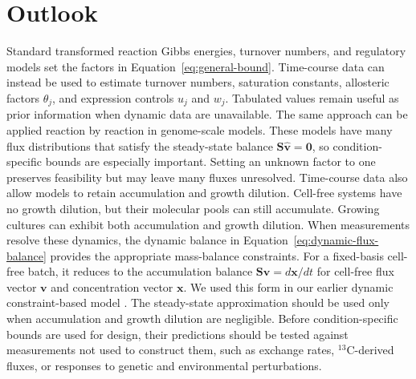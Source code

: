 \section{Outlook}\label{sec:outlook}

Standard transformed reaction Gibbs energies, turnover numbers, and regulatory
models set the factors in Equation~\eqref{eq:general-bound}.
Time-course data can instead be used to estimate turnover numbers, saturation
constants, allosteric factors $\theta_j$, and expression controls $u_j$ and
$w_j$. Tabulated values remain useful as prior information when dynamic data
are unavailable. The same approach can be applied reaction by reaction in
genome-scale models. These models have many flux distributions that satisfy
the steady-state balance $\mathbf S\hat{\mathbf v}=\mathbf 0$, so
condition-specific bounds are
especially important. Setting an unknown factor to one preserves feasibility
but may leave many fluxes unresolved. Time-course data also allow models to
retain accumulation and growth dilution. Cell-free systems have no growth
dilution, but their molecular pools can still accumulate. Growing cultures can
exhibit both accumulation and growth dilution. When measurements resolve these dynamics,
the dynamic balance in Equation~\eqref{eq:dynamic-flux-balance} provides the
appropriate mass-balance constraints. For a fixed-basis cell-free batch, it reduces to
the accumulation balance $\mathbf S\mathbf v=d\mathbf x/dt$ for cell-free
flux vector $\mathbf v$ and concentration vector $\mathbf x$. We used this form
in our earlier dynamic constraint-based model \cite{Dai2018}. The steady-state approximation should
be used only when accumulation and growth dilution are negligible. Before
condition-specific bounds are used for design, their predictions should be
tested against measurements not used to construct them, such as exchange
rates, $^{13}$C-derived fluxes, or responses to genetic and environmental
perturbations.
